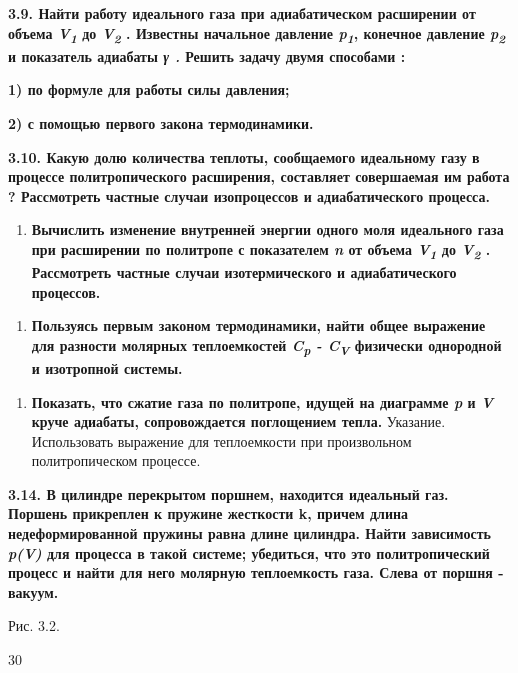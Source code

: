 \textbf{3.9. Найти работу идеального газа при адиабатическом расширении
от объема \emph{V\textsubscript{1}} до \emph{V\textsubscript{2}} .
Известны начальное давление \emph{p\textsubscript{1}}, конечное давление
\emph{p\textsubscript{2}} и показатель адиабаты \emph{γ .} Решить задачу
двумя способами :}

\textbf{1) по формуле для работы силы давления;}

\textbf{2) с помощью первого закона термодинамики.}


\textbf{3.10. Какую долю количества теплоты, сообщаемого идеальному газу
в процессе политропического расширения, составляет совершаемая им работа
? Рассмотреть частные случаи изопроцессов и адиабатического процесса.}

\begin{enumerate}
\def\labelenumi{\arabic{enumi}.}
\setcounter{enumi}{10}
\item
  \textbf{Вычислить изменение внутренней энергии одного моля идеального
  газа при расширении по политропе с показателем \emph{n} от объема
  \emph{V\textsubscript{1}} до \emph{V\textsubscript{2}} . Рассмотреть
  частные случаи изотермического и адиабатического процессов.}
\end{enumerate}

\begin{enumerate}
\def\labelenumi{\arabic{enumi}.}
\setcounter{enumi}{10}
\item
  \textbf{Пользуясь первым законом термодинамики, найти общее выражение
  для разности молярных теплоемкостей \emph{C\textsubscript{p} -
  C\textsubscript{V}} физически однородной и изотропной системы.}
\end{enumerate}

\begin{enumerate}
\def\labelenumi{\arabic{enumi}.}
\setcounter{enumi}{10}
\item
  \textbf{Показать, что сжатие газа по политропе, идущей на диаграмме
  \emph{p} и \emph{V} круче адиабаты, сопровождается поглощением тепла.}
  Указание. Использовать выражение для теплоемкости при произвольном
  политропическом процессе.
\end{enumerate}

\textbf{3.14.
В цилиндре перекрытом поршнем, находится идеальный газ. Поршень
прикреплен к пружине жесткости k, причем длина недеформированной пружины
равна длине цилиндра. Найти зависимость \emph{p(V)} для процесса в такой
системе; убедиться, что это политропический процесс и найти для него
молярную теплоемкость газа. Слева от поршня - вакуум.}

Рис. 3.2.

30